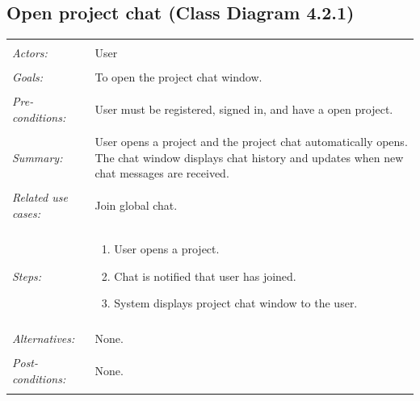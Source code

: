 \documentclass[11pt]{report}
\begin{document}
\subsection{Open project chat (Class Diagram 4.2.1)}
\begin{tabular}{ p{2cm} p{12cm} }
 \hline
 \\
 \textit{Actors:} & User \\ 
 \\
 \textit{Goals:} & To open the project chat window. \\
 \\
 \textit{Pre-conditions:} & User must be registered, signed in, and have a open project.  \\
 \\
 \textit{Summary:} & User opens a project and the project chat automatically opens. The chat window displays chat history and updates when new chat messages are received. \\ 
 \\
 \textit{Related use cases:} & Join global chat. \\ 
 \\
 \textit{Steps:} & \begin{enumerate}
  \item User opens a project.
  \item Chat is notified that user has joined.
  \item System displays project chat window to the user.
 \end{enumerate} \\
 \\
 \textit{Alternatives:} & None. \\
 \\
 \textit{Post-conditions:} & None. \\
 \\
\hline
\end{tabular}
\end{document}
